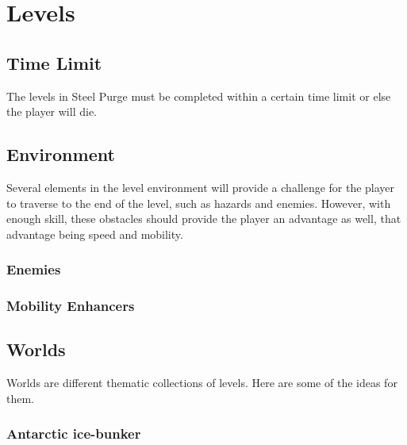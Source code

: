 \documentclass[../Main.tex]{subfiles}
\begin{document}
\section{Levels}

\subsection{Time Limit}

The levels in Steel Purge must be completed within a certain time limit or else the player will die. 

\subsection{Environment}

Several elements in the level environment will provide a challenge for the player to traverse to the end of the level, such as hazards and enemies. However, with enough skill, these obstacles should provide the player an advantage as well, that advantage being speed and mobility. 

\subsubsection{Enemies}

\subsubsection{Mobility Enhancers}

\subsection{Worlds}

Worlds are different thematic collections of levels. Here are some of the ideas for them.

\subsubsection{Antarctic ice-bunker}
\end{document}
